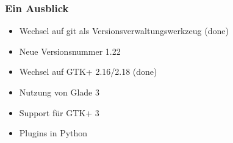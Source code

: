 \begin{frame}
	\frametitle{Ein Ausblick}
	\begin{block}
		\begin{itemize}
			\item Wechsel auf git als Versionsverwaltungswerkzeug (done)
			\item Neue Versionsnummer 1.22
			\item Wechsel auf GTK+ 2.16/2.18 (done)
			\item Nutzung von Glade 3 
			\item Support für GTK+ 3
			\item Plugins in Python
		\end{itemize}
	\end{block}
\end{frame}
